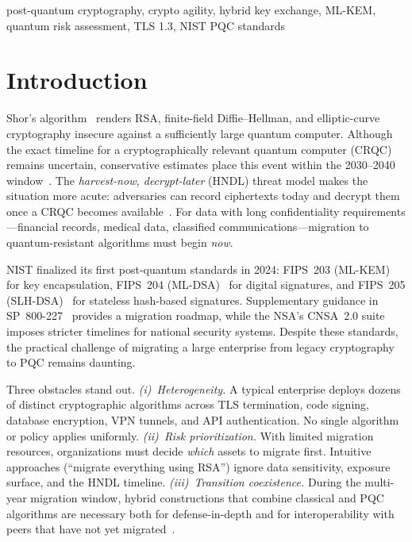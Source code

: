 \documentclass[conference,10pt]{IEEEtran}
\newcommand{\mlkem}{\textrm{ML-KEM}}
\newcommand{\mldsa}{\textrm{ML-DSA}}
\newcommand{\slhdsa}{\textrm{SLH-DSA}}
\begin{document}
\begin{IEEEkeywords}
post-quantum cryptography, crypto agility, hybrid key exchange,
ML-KEM, quantum risk assessment, TLS 1.3, NIST PQC standards
\end{IEEEkeywords}

\section{Introduction}\label{sec:intro}

Shor's algorithm~\cite{shor1997} renders RSA, finite-field
Diffie--Hellman, and elliptic-curve cryptography insecure against a
sufficiently large quantum computer. Although the exact timeline for a
cryptographically relevant quantum computer (CRQC) remains uncertain,
conservative estimates place this event within the 2030--2040
window~\cite{mosca2018}. The \emph{harvest-now, decrypt-later} (HNDL)
threat model makes the situation more acute: adversaries can record
ciphertexts today and decrypt them once a CRQC becomes
available~\cite{mavroeidis2018}. For data with long confidentiality
requirements---financial records, medical data, classified
communications---migration to quantum-resistant algorithms must begin
\emph{now}.

NIST finalized its first post-quantum standards in 2024: FIPS~203
(\mlkem{})~\cite{nist-fips203} for key encapsulation, FIPS~204
(\mldsa{})~\cite{nist-fips204} for digital signatures, and FIPS~205
(\slhdsa{})~\cite{nist-fips205} for stateless hash-based signatures.
Supplementary guidance in SP~800-227~\cite{nist-sp800-227} provides a
migration roadmap, while the NSA's CNSA~2.0 suite~\cite{cnsa2} imposes
stricter timelines for national security systems. Despite these
standards, the practical challenge of migrating a large enterprise from
legacy cryptography to PQC remains daunting.

Three obstacles stand out.
\emph{(i)~Heterogeneity.}  A typical enterprise deploys dozens of
distinct cryptographic algorithms across TLS termination, code signing,
database encryption, VPN tunnels, and API authentication. No single
algorithm or policy applies uniformly.
\emph{(ii)~Risk prioritization.}  With limited migration resources,
organizations must decide \emph{which} assets to migrate first.
Intuitive approaches (``migrate everything using RSA'') ignore data
sensitivity, exposure surface, and the HNDL timeline.
\emph{(iii)~Transition coexistence.}  During the multi-year migration
window, hybrid constructions that combine classical and PQC algorithms
are necessary both for defense-in-depth and for interoperability with
peers that have not yet migrated~\cite{bindel2019}.
\end{document}
